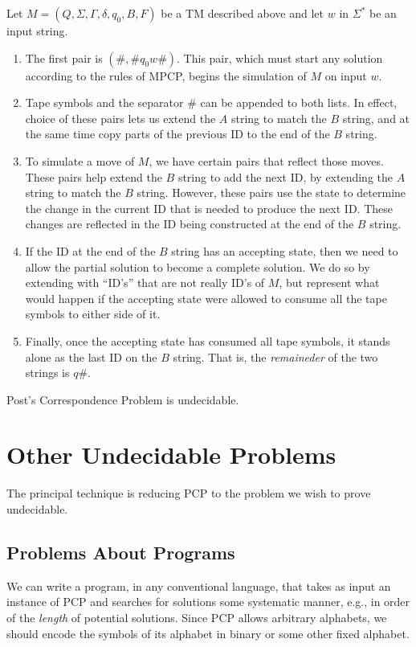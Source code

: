 \documentclass[]{article}
\begin{document}
Let $M = (Q,\Sigma,\Gamma,\delta,q_0,B,F)$ be a TM described above and let $w$
in $\Sigma^*$ be an input string.
\begin{enumerate}
\item The first pair is $(\#, \#q_0w\#)$. This pair, which must start any
solution according to the rules of MPCP, begins the simulation of $M$ on input
$w$.
\item Tape symbols and the separator $\#$ can be appended to both lists. In
effect, choice of these pairs lets us extend the $A$ string to match the $B$
string, and at the same time copy parts of the previous ID to the end of the $B$
string.
\item To simulate a move of $M$, we have certain pairs that reflect those moves.
These pairs help extend the $B$ string to add the next ID, by extending the $A$
string to match the $B$ string. However, these pairs use the state to determine
the change in the current ID that is needed to produce the next ID. These
changes are reflected in the ID being constructed at the end of the $B$ string.
\item If the ID at the end of the $B$ string has an accepting state, then we
need to allow the partial solution to become a complete solution. We do so by
extending with ``ID's'' that are not really ID's of $M$, but represent what
would happen if the accepting state were allowed to consume all the tape symbols
to either side of it.
\item Finally, once the accepting state has consumed all tape symbols, it stands
alone as the last ID on the $B$ string. That is, the \emph{remaineder} of the
two strings is $q\#$.
\end{enumerate}

\begin{thm}
Post's Correspondence Problem is undecidable.
\end{thm}

\section*{Other Undecidable Problems}
The principal technique is reducing PCP to the problem we wish to prove
undecidable.
\subsection*{Problems About Programs}
We can write a program, in any conventional language, that takes as input an
instance of PCP and searches for solutions some systematic manner, e.g., in
order of the \emph{length} of potential solutions. Since PCP allows arbitrary
alphabets, we should encode the symbols of its alphabet in binary or some other
fixed alphabet.
\end{document}
